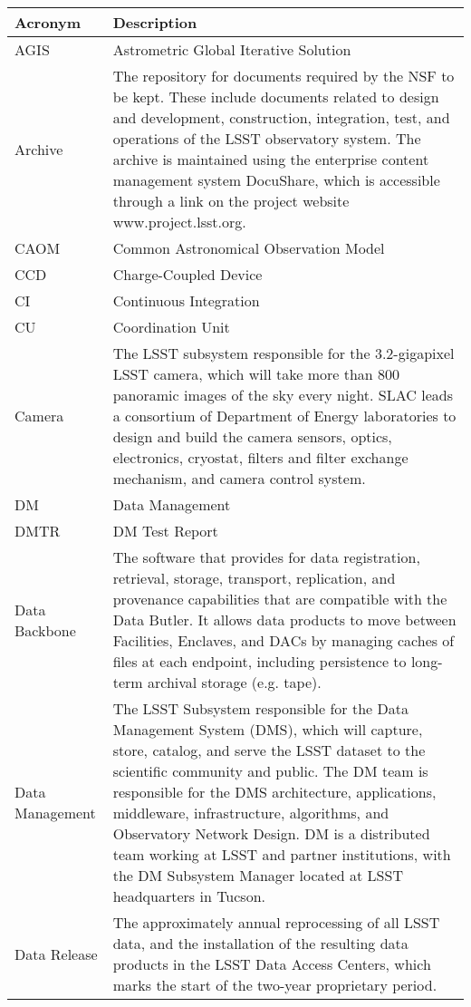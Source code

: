 \addtocounter{table}{-1}
\begin{longtable}{|l|p{}|}\hline
\textbf{Acronym} & \textbf{Description}  \\\hline

AGIS & Astrometric Global Iterative Solution \\\hline
Archive & The repository for documents required by the NSF to be kept. These include documents related to design and development, construction, integration, test, and operations of the LSST observatory system. The archive is maintained using the enterprise content management system DocuShare, which is accessible through a link on the project website www.project.lsst.org. \\\hline
CAOM & Common Astronomical Observation Model \\\hline
CCD & Charge-Coupled Device \\\hline
CI & Continuous Integration \\\hline
CU & Coordination Unit \\\hline
Camera & The LSST subsystem responsible for the 3.2-gigapixel LSST camera, which will take more than 800 panoramic images of the sky every night. SLAC leads a consortium of Department of Energy laboratories to design and build the camera sensors, optics, electronics, cryostat, filters and filter exchange mechanism, and camera control system. \\\hline
DM & Data Management \\\hline
DMTR & DM Test Report \\\hline
Data Backbone & The software that provides for data registration, retrieval, storage, transport, replication, and provenance capabilities that are compatible with the Data Butler. It allows data products to move between Facilities, Enclaves, and DACs by managing caches of files at each endpoint, including persistence to long-term archival storage (e.g. tape). \\\hline
Data Management & The LSST Subsystem responsible for the Data Management System (DMS), which will capture, store, catalog, and serve the LSST dataset to the scientific community and public. The DM team is responsible for the DMS architecture, applications, middleware, infrastructure, algorithms, and Observatory Network Design. DM is a distributed team working at LSST and partner institutions, with the DM Subsystem Manager located at LSST headquarters in Tucson. \\\hline
Data Release & The approximately annual reprocessing of all LSST data, and the installation of the resulting data products in the LSST Data Access Centers, which marks the start of the two-year proprietary period. \\\hline

\end{longtable}
